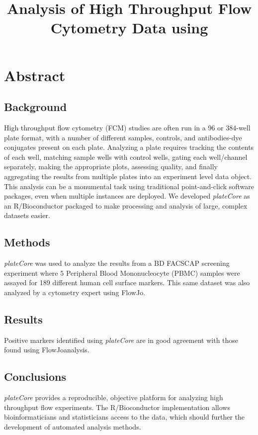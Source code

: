 \documentclass[12pt]{article}
\title{Analysis of High Throughput Flow Cytometry Data using \Rpackage{plateCore}}
\newcommand{\Rpackage}[1]{{\textit{#1}}}
\begin{document}
\maketitle

\clearpage
\section*{Abstract}
\subsection*{Background}
High throughput flow cytometry (FCM) studies are often run in a 96 or 384-well plate format, with a number of different samples, 
controls, and antibodies-dye conjugates present on each plate. 
Analyzing a plate requires tracking the contents
of each well, matching sample wells with control wells, gating each well/channel separately, making the appropriate plots,
assessing quality, and finally aggregating the results from multiple plates into an experiment level data object. 
This analysis can be a monumental task using traditional point-and-click software packages, even when multiple instances are
deployed. We developed \Rpackage{plateCore} as an R/Bioconductor packaged to make processing and analysis of
large, complex datasets easier. 

\subsection*{Methods}
\Rpackage{plateCore} was used to analyze the results from a BD FACS\texttrademark CAP screening experiment where 5
Peripheral Blood Mononucleocyte (PBMC) samples 
were assayed for 189 different human cell surface markers. 
This same dataset was also analyzed by a cytometry expert using FlowJo\texttrademark.

\subsection*{Results}
Positive markers identified using \Rpackage{plateCore} are in good agreement with those found using FlowJo\texttrademark analysis.

\subsection*{Conclusions}
\Rpackage{plateCore} provides a reproducible, objective platform for analyzing high throughput flow experiments. The R/Bioconductor 
implementation allows bioinformaticians and statisticians access to the data, which should further the development of automated
analysis methods.
\end{document}

